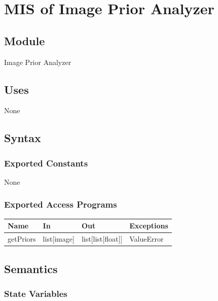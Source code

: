 \documentclass[12pt, titlepage]{article}
\begin{document}
\section{MIS of Image Prior Analyzer }\label{image prior analyzer}
  
  
  
  \subsection{Module}
  
  Image Prior Analyzer
  
  \subsection{Uses}
  
  None

  \subsection{Syntax}


  
  \subsubsection{Exported Constants}
  None
  \subsubsection{Exported Access Programs}
  
  \begin{center}
  \begin{tabular}{p{2cm} p{4cm} p{4cm} p{2cm}}
  \hline
  \textbf{Name} & \textbf{In} & \textbf{Out} & \textbf{Exceptions} \\
  \hline
  getPriors & list[image] & list[list[float]]  & ValueError \\
  
  \end{tabular}
  \end{center}
  
  \subsection{Semantics}
  
  \subsubsection{State Variables}
  
\end{document}

